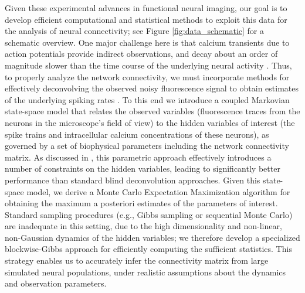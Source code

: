\documentclass[aoas,preprint]{imsart}
\begin{document}
Given these experimental advances in functional neural imaging, our
goal is to develop efficient computational and statistical methods to
exploit this data for the analysis of neural connectivity; see Figure
\ref{fig:data_schematic} for a schematic overview. One major challenge
here is that calcium transients due to action potentials provide
indirect observations, and decay about an order of magnitude slower
than the time course of the underlying neural activity
\cite{ImagingManual,Roxin08}. Thus, to properly analyze the network
connectivity, we must incorporate methods for effectively deconvolving
the observed noisy fluorescence signal to obtain estimates of the
underlying spiking rates
\cite{YaksiFriedrich06,GreenbergKerr08,Vogelstein2009}. To this end we
introduce a coupled Markovian state-space model that relates the
observed variables (fluorescence traces from the neurons in the
microscope's field of view) to the hidden variables of interest (the
spike trains and intracellular calcium concentrations of these
neurons), as governed by a set of biophysical parameters including the
network connectivity matrix.  As discussed in \cite{Vogelstein2009},
this parametric approach effectively introduces a number of
constraints on the hidden variables, leading to significantly better
performance than standard blind deconvolution approaches.  Given this
state-space model, we derive a Monte Carlo Expectation Maximization
algorithm for obtaining the maximum a posteriori estimates of the
parameters of interest. Standard sampling procedures (e.g., Gibbs
sampling or sequential Monte Carlo) are inadequate in this setting,
due to the high dimensionality and non-linear, non-Gaussian dynamics
of the hidden variables; we therefore develop a specialized
blockwise-Gibbs approach for efficiently computing the sufficient
statistics. This strategy enables us to accurately infer the
connectivity matrix from large simulated neural populations, under
realistic assumptions about the dynamics and observation parameters.
\end{document}
